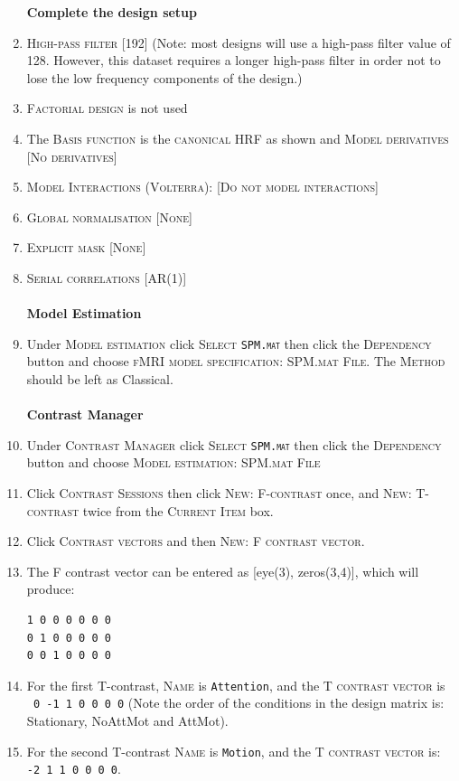 \begin{enumerate}
\textbf{Complete the design setup}
\item \textsc{High-pass filter} [192] (Note: most designs will use a high-pass filter value of 128. However, this dataset requires a longer high-pass filter in order not to lose the low frequency components of the design.)
\item \textsc{Factorial design} is not used
\item The \textsc{Basis function} is the \textsc{canonical HRF} as shown and \textsc{Model derivatives} [\textsc{No derivatives}]
\item \textsc{Model Interactions (Volterra)}: [\textsc{Do not model interactions}]
\item \textsc{Global normalisation} [\textsc{None}]
\item \textsc{Explicit mask} [\textsc{None}]
\item \textsc{Serial correlations} [\textsc{AR(1)}]\\\\

\textbf{Model Estimation}
\item Under \textsc{Model estimation} click \textsc{Select \texttt{SPM.mat}} then click the \textsc{Dependency} button and choose \textsc{fMRI model specification: SPM.mat File}. The \textsc{Method} should be left as Classical.\\\\

\textbf{Contrast Manager}
\item Under \textsc{Contrast Manager} click \textsc{Select \texttt{SPM.mat}} then click the \textsc{Dependency} button and choose \textsc{Model estimation: SPM.mat File}

\item Click \textsc{Contrast Sessions} then click \textsc{New: F-contrast} once, and \textsc{New: T-contrast} twice from the \textsc{Current Item} box.
\item Click \textsc{Contrast vectors} and then \textsc{New: F contrast vector}. 
\item The F contrast vector can be entered as [eye(3), zeros(3,4)], which will produce:
\begin{verbatim}
1 0 0 0 0 0 0
0 1 0 0 0 0 0
0 0 1 0 0 0 0
\end{verbatim}

\item For the first T-contrast, \textsc{Name} is \texttt{Attention}, and the \textsc{T contrast vector} is \texttt{~0~-1~1~0~0~0~0} (Note the order of the conditions in the design matrix is: Stationary, NoAttMot and AttMot).
\item For the second T-contrast \textsc{Name} is \texttt{Motion}, and the \textsc{T contrast vector} is: \texttt{-2~1~1~0~0~0~0}.


\end{enumerate}
